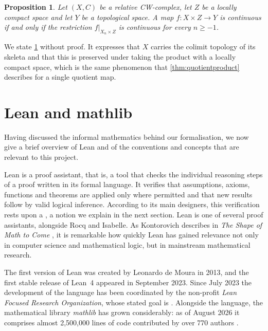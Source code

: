 \documentclass[11pt, a4paper, english]{article}
\newcommand{\restrict}[2]{\left.#1\right|_{#2}}
\theoremstyle{plain}
\newtheorem{proposition}[theorem]{Proposition}
\theoremstyle{definition}
\theoremstyle{remark}
\numberwithin{equation}{section}
\numberwithin{theorem}{section}
\begin{document}
\begin{proposition} \label{prop:CWcontinuity}
    Let $(X,C)$ be a relative CW-complex, let $Z$ be a locally compact space and let $Y$ be a topological space. A map $f \colon X \times Z \to Y$ is continuous if and only if the restriction $\restrict{f}{X_n \times Z}$ is continuous for every $n \ge -1$.
\end{proposition}

We state \cref{prop:CWcontinuity} without proof. It expresses that $X$ carries the colimit topology of its skeleta and that this is preserved under taking the product with a locally compact space, which is the same phenomenon that \cref{thm:quotientproduct} describes for a single quotient map.


\clearpage 
\section {Lean and mathlib} \label{section:Lean}

Having discussed the informal mathematics behind our formalisation, we now give a brief overview of Lean and of the conventions and concepts that are relevant to this project.

Lean is a proof assistant, that is, a tool that checks the individual reasoning steps of a proof written in its formal language. It verifies that assumptions, axioms, functions and theorems are applied only where permitted and that new results follow by valid logical inference. According to its main designers, this verification rests upon a , a notion we explain in the next section. Lean is one of several proof assistants, alongside Rocq and Isabelle. As Kontorovich describes in \emph{The Shape of Math to Come} \cite{KON25}, it is remarkable how quickly Lean has gained relevance not only in computer science and mathematical logic, but in mainstream mathematical research.

The first version of Lean was created by Leonardo de Moura in 2013, and the first stable release of Lean~4 appeared in September 2023. Since July 2023 the development of the language has been coordinated by the non-profit \emph{Lean Focused Research Organization}, whose stated goal is . Alongside the language, the mathematical library \emph{mathlib} has grown considerably: as of August 2026 it comprises almost 2,500,000 lines of code contributed by over 770 authors \cite{MStats}.
\end{document}
